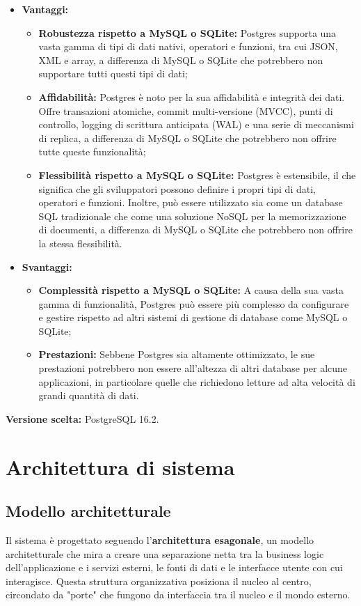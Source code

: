 \documentclass[10pt, a4paper]{article}
\begin{document}
\begin{itemize}
\item \textbf{Vantaggi:}
\begin{itemize}
\item \textbf{Robustezza rispetto a MySQL o SQLite:} Postgres supporta una vasta gamma di tipi di dati nativi, operatori e funzioni, tra cui JSON, XML e array, a differenza di MySQL o SQLite che potrebbero non supportare tutti questi tipi di dati;
\item \textbf{Affidabilità:} Postgres è noto per la sua affidabilità e integrità dei dati. Offre transazioni atomiche, commit multi-versione (MVCC), punti di controllo, logging di scrittura anticipata (WAL) e una serie di meccanismi di replica, a differenza di MySQL o SQLite che potrebbero non offrire tutte queste funzionalità;
\item \textbf{Flessibilità rispetto a MySQL o SQLite:} Postgres è estensibile, il che significa che gli sviluppatori possono definire i propri tipi di dati, operatori e funzioni. Inoltre, può essere utilizzato sia come un database SQL tradizionale che come una soluzione NoSQL per la memorizzazione di documenti, a differenza di MySQL o SQLite che potrebbero non offrire la stessa flessibilità.
\end{itemize}
\item \textbf{Svantaggi:}
\begin{itemize}
\item \textbf{Complessità rispetto a MySQL o SQLite:} A causa della sua vasta gamma di funzionalità, Postgres può essere più complesso da configurare e gestire rispetto ad altri sistemi di gestione di database come MySQL o SQLite;
\item \textbf{Prestazioni:} Sebbene Postgres sia altamente ottimizzato, le sue prestazioni potrebbero non essere all'altezza di altri database per alcune applicazioni, in particolare quelle che richiedono letture ad alta velocità di grandi quantità di dati.
\end{itemize}
\end{itemize}
\textbf{Versione scelta:} PostgreSQL 16.2.

\newpage
\section{Architettura di sistema}
\subsection{Modello architetturale}
Il sistema è progettato seguendo l'\textbf{architettura esagonale}, un modello architetturale che mira a creare una separazione netta tra la business logic dell'applicazione e i servizi esterni, le fonti di dati e le interfacce utente con cui interagisce.
Questa struttura organizzativa posiziona il nucleo al centro, circondato da "porte" che fungono da interfaccia tra il nucleo e il mondo esterno.
\end{document}
